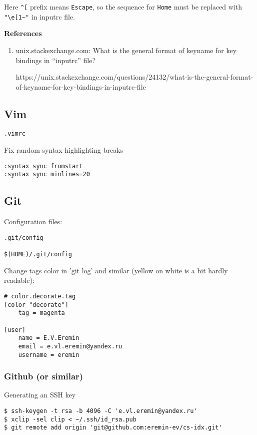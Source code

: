 \documentclass{article}
\begin{document}
Here \verb"^[" prefix means \verb"Escape", so the sequence for \verb"Home" must 
be replaced with \verb'"\e[1~"' in inputrc file.

\textbf{References}

\begin{enumerate}
\item unix.stackexchange.com: What is the general format of keyname for key 
bindings in “inputrc” file?

	https://unix.stackexchange.com/questions/24132/what-is-the-general-format-of-keyname-for-key-bindings-in-inputrc-file
\end{enumerate}

\subsection{Vim}

\begin{verbatim}
.vimrc
\end{verbatim}

Fix random syntax highlighting breaks

\begin{verbatim}
:syntax sync fromstart
:syntax sync minlines=20
\end{verbatim}

\subsection{Git}

Configuration files:

\begin{verbatim}
.git/config

$(HOME)/.git/config
\end{verbatim}

Change tags color in 'git log' and similar (yellow on white is a bit hardly 
readable):
\begin{verbatim}
# color.decorate.tag
[color "decorate"]
    tag = magenta

[user]
    name = E.V.Eremin
    email = e.vl.eremin@yandex.ru
    username = eremin
\end{verbatim}

\subsubsection{Github (or similar)}

Generating an SSH key

\begin{verbatim}
$ ssh-keygen -t rsa -b 4096 -C 'e.vl.eremin@yandex.ru'
$ xclip -sel clip < ~/.ssh/id_rsa.pub
$ git remote add origin 'git@github.com:eremin-ev/cs-idx.git'
\end{verbatim}
\end{document}
